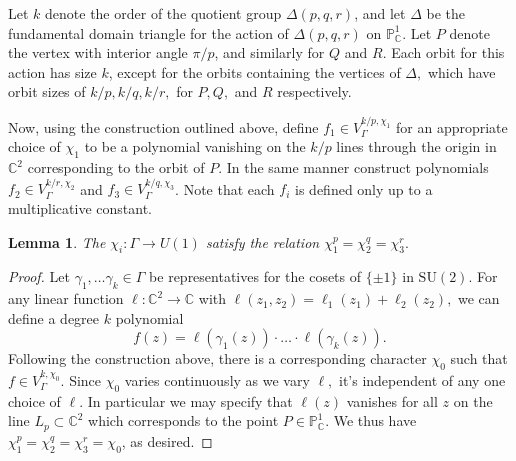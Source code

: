 \documentclass{article}
\newtheorem{lemma}{Lemma}[section]
\begin{document}
Let $k$ denote the order of the quotient group $\Delta(p,q,r)$, and let $\Delta$ be the fundamental domain triangle for the action of $\Delta(p,q,r)$ on $\mathbb{P}_\mathbb{C}^1$. Let $P$ denote the vertex with interior angle $\pi/p$, and similarly for $Q$ and $R$. Each orbit for this action has size $k$, except for the orbits containing the vertices of $\Delta,$ which have orbit sizes of $k/p, k/q, k/r,$ for $P,Q,$ and $R$ respectively.

Now, using the construction outlined above, define $f_1 \in V^{k/p, \chi_1}_\Gamma$ for an appropriate choice of $\chi_1$ to be a polynomial vanishing on the $k/p$ lines through the origin in $\mathbb{C}^2$ corresponding to the orbit of $P$. In the same manner construct polynomials $f_2 \in V^{k/r, \chi_2}_\Gamma$ and $f_3 \in V^{k/q, \chi_3}_\Gamma$. Note that each $f_i$ is defined only up to a multiplicative constant.

\begin{lemma}
\label{lemma_4.2}
The $\chi_i: \Gamma \to U(1)$ satisfy the relation $\chi_1^p = \chi_2^q = \chi_3^r.$
\end{lemma}
\begin{proof}Let $\gamma_1, \dots \gamma_k \in \Gamma$ be representatives for the cosets of $\{\pm 1\}$ in $\mathrm{SU}(2).$ For any linear function $\ell: \mathbb{C}^2 \to \mathbb{C}$ with $\ell(z_1, z_2) = \ell_1(z_1) + \ell_2(z_2),$ we can define a degree $k$ polynomial
\[f(z) = \ell(\gamma_1(z)) \cdot \dots \cdot \ell(\gamma_k(z)).\]
Following the construction above, there is a corresponding character $\chi_0$ such that $f \in V^{k, \chi_{0}}_\Gamma$. Since $\chi_0$ varies continuously as we vary $\ell,$ it's independent of any one choice of $\ell$. In particular we may specify that $\ell(z)$ vanishes for all $z$ on the line $L_p \subset \mathbb{C}^2$ which corresponds to the point $P \in \mathbb{P}_\mathbb{C}^1$. We thus have $\chi_1^p = \chi_2^q = \chi_3^r = \chi_{0}$, as desired.
\end{proof}
\end{document}
